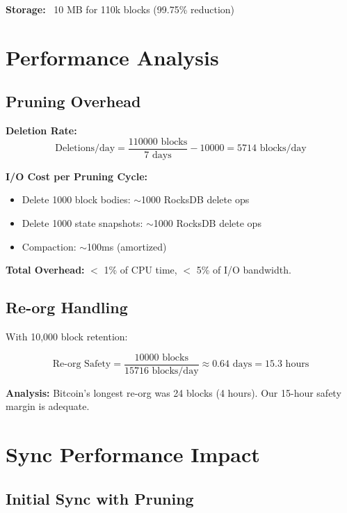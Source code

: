 \documentclass[11pt,a4paper]{article}
\begin{document}
\textbf{Storage:} ~10 MB for 110k blocks (99.75\% reduction)

\section{Performance Analysis}

\subsection{Pruning Overhead}

\textbf{Deletion Rate:}
\begin{equation}
\text{Deletions/day} = \frac{110000\text{ blocks}}{7\text{ days}} - 10000 = 5714\text{ blocks/day}
\end{equation}

\textbf{I/O Cost per Pruning Cycle:}
\begin{itemize}
\item Delete 1000 block bodies: $\sim$1000 RocksDB delete ops
\item Delete 1000 state snapshots: $\sim$1000 RocksDB delete ops
\item Compaction: $\sim$100ms (amortized)
\end{itemize}

\textbf{Total Overhead:} $<$ 1\% of CPU time, $<$ 5\% of I/O bandwidth.

\subsection{Re-org Handling}

With 10,000 block retention:

\begin{equation}
\text{Re-org Safety} = \frac{10000\text{ blocks}}{15716\text{ blocks/day}} \approx 0.64\text{ days} = 15.3\text{ hours}
\end{equation}

\textbf{Analysis:} Bitcoin's longest re-org was 24 blocks (4 hours). Our 15-hour safety margin is adequate.

\section{Sync Performance Impact}

\subsection{Initial Sync with Pruning}
\end{document}
